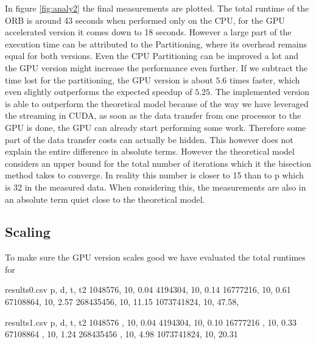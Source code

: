 \documentclass[]{article}
\begin{document}
In figure \ref{fig:analy2} the final measurements are plotted. The total runtime of the ORB is around 43 seconds when performed only on the CPU, for the GPU accelerated version it comes down to 18 seconds. However a large part of the execution time can be attributed to the Partitioning, where its overhead remains equal for both versions. Even the CPU Partitioning can be improved a lot and the GPU version might increase the performance even further. 
If we subtract the time lost for the partitioning, the GPU version is about $5.6$ times faster, which even slightly outperforms the expected speedup of $5.25$. The implemented version is able to outperform the theoretical model because of the way we have leveraged the streaming in CUDA, as soon as the data transfer from one processor to the GPU is done, the GPU can already start performing some work. Therefore some part of the data transfer costs can actually be hidden. This however does not explain the entire difference in absolute terms. However the theoretical model considers an upper bound for the total number of iterations which it the bisection method takes to converge. In reality this number is closer to 15 than to p which is 32 in the measured data. When considering this, the measurements are also in an absolute term quiet close to the theoretical model.  
\subsection{Scaling}

To make sure the GPU version scales good we have evaluated the total runtimes for 


\begin{filecontents*}{results0.csv}
	p, d, t, t2
	1048576, 10, 0.04
	4194304, 10, 0.14
	16777216, 10, 0.61
	67108864, 10, 2.57
	268435456, 10, 11.15
	1073741824, 10, 47.58, 
\end{filecontents*}

\begin{filecontents*}{results1.csv}
	p, d, t, t2
	1048576 , 10, 0.04
	4194304, 10, 0.10
	16777216 , 10, 0.33
	67108864 , 10, 1.24
	268435456 , 10, 4.98
	1073741824, 10, 20.31
\end{filecontents*}
\end{document}
